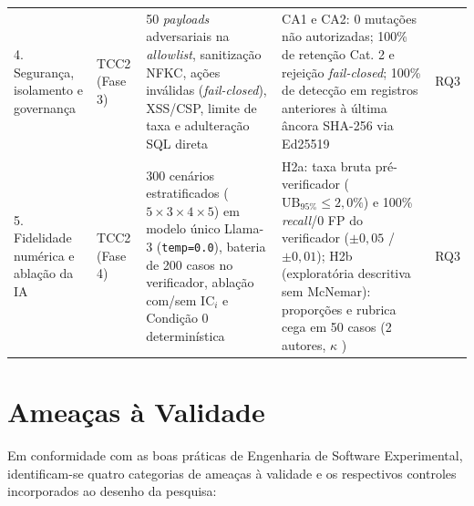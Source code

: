 \documentclass[12pt,openany,oneside,a4paper,english,brazilian,sumario=tradicional]{abntex2}
\newcommand{\fonteautores}{\par\vspace{1mm}{\small Fonte: Elaborado pelos autores (2026).}}
\newcommand{\IC}{\mathrm{IC}}
\begin{document}
\begin{table}[htbp]
\begin{tabularx}{\textwidth}{L{2.2cm} L{1.3cm} Y Y p{0.8cm}}
4. Segurança, isolamento e governança & TCC2 (Fase 3) & 50 \textit{payloads} adversariais \cite{greshake2023,debenedetti2024} na \textit{allowlist}, sanitização NFKC, ações inválidas (\textit{fail-closed}), XSS/CSP, limite de taxa e adulteração SQL direta & CA1 e CA2: 0 mutações não autorizadas; 100\% de retenção Cat. 2 e rejeição \textit{fail-closed}; 100\% de detecção em registros anteriores à última âncora SHA-256 via Ed25519 \cite{rfc8032} & RQ3\\
5. Fidelidade numérica e ablação da IA & TCC2 (Fase 4) & 300 cenários estratificados ($5\times 3\times 4\times 5$) em modelo único Llama-3 (\texttt{temp=0.0}), bateria de 200 casos no verificador, ablação com/sem $\IC_i$ e Condição 0 determinística & H2a: taxa bruta pré-verificador ($\mathrm{UB}_{95\%} \le 2{,}0\%$) e 100\% \textit{recall}/0 FP do verificador ($\pm 0{,}05$ / $\pm 0{,}01$); H2b (exploratória descritiva sem McNemar): proporções e rubrica cega em 50 casos (2 autores, $\kappa$ \cite{cohen1960}) & RQ3\\
\bottomrule
\end{tabularx}
\fonteautores
\end{table}

\section{Ameaças à Validade}\label{sec:ameacas_validade}

Em conformidade com as boas práticas de Engenharia de Software Experimental, identificam-se quatro categorias de ameaças à validade e os respectivos controles incorporados ao desenho da pesquisa:
\end{document}
